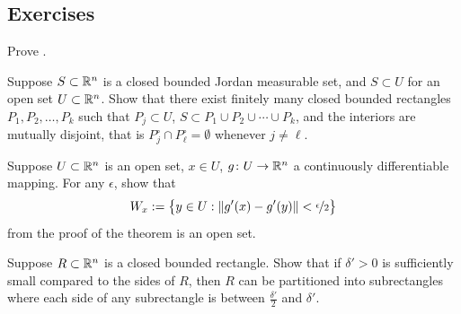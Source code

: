 \subsection{Exercises}

\begin{exercise}
Prove .
\end{exercise}

\begin{exercise}
Suppose $S \subset {\mathbb{R}}^n$ is a closed bounded Jordan measurable set,
and $S \subset U$ for an open set $U \subset {\mathbb{R}}^n$.
Show that there exist finitely many closed bounded rectangles
$P_1,P_2, \ldots, P_k$ such that $P_j \subset U$,
$S \subset P_1 \cup P_2 \cup \cdots \cup P_k$, and
the interiors are mutually disjoint, that is
$P_j^\circ \cap P^\circ_\ell = \emptyset$ whenever $j \not= \ell$.
\end{exercise}

\begin{exercise}
Suppose $U \subset {\mathbb{R}}^n$ is an open set, $x \in U$,
$g \colon U \to {\mathbb{R}}^n$ a continuously differentiable mapping.
For any $\epsilon$, show that
\begin{equation*}
W_x := \bigl\{ y \in U : \lVert {g'(x)-g'(y)} \rVert < \nicefrac{\epsilon}{2} \bigr\}
\end{equation*}
from the proof of the theorem is an open set.
\end{exercise}

\begin{exercise}
Suppose $R \subset {\mathbb{R}}^n$ is a closed bounded rectangle.
Show that if $\delta' > 0$ is sufficiently small compared
to the sides of $R$, then $R$ can be partitioned
into subrectangles where each side of any subrectangle
is between $\frac{\delta'}{2}$ and $\delta'$.
\end{exercise}
